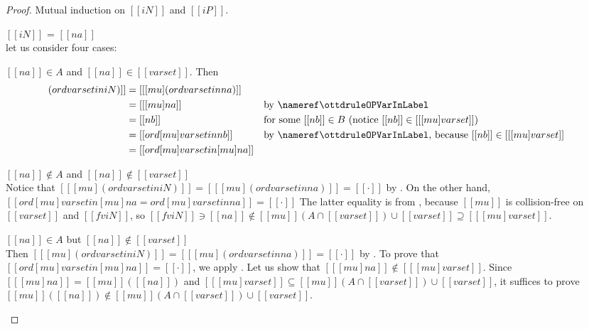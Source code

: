 \lemDistrMuOrd*
\begin{proof}
  Mutual induction on $[[iN]]$ and $[[iP]]$.
  \begin{caseof}
  \item $[[iN]]$ = $[[na]]$ \label{case:distr-mu-ord:var} \\
    let us consider four cases:
    \begin{caseof}
    \item $[[na]] \in A$ and $[[na]] \in [[varset]]$. Then
      \begin{align*} [[ [mu] (ord varset in iN) ]] &= [[ [mu] (ord varset in na)]] \\
                                                             &= [[ [mu] na ]]
                                                             && \text{by \ruleref{\ottdruleOPVarInLabel}}\\
                                                             &= [[nb]]
                                                             && \text{for some $[[nb]] \in B$ (notice $[[nb]] \in [[ [mu]varset ]]$)} \\
                                                             &= [[ ord [mu]varset in nb ]]
                                                             && \text{by \ruleref{\ottdruleOPVarInLabel},
                                                                because $[[nb]] \in [[ [mu]varset ]]$} \\
                                                             &= [[ord [mu] varset in [mu] na ]]
       \end{align*}
     \item $[[na]] \notin A$ and $[[na]] \notin [[varset]]$\\
       Notice that
       $[[ [mu] (ord varset in iN) ]] = [[ [mu] (ord varset in na)]] = [[·]]$ by
       .
       On the other hand, $[[ ord [mu] varset in [mu] na = ord [mu] varset
       in na ]] = [[·]]$ The latter equality is from
       , because
       $[[mu]]$ is collision-free on $[[varset]]$ and $[[fv iN]]$, so
       $[[fv iN]] \ni [[na]] \notin [[mu]](A \cap [[varset]]) \cup
       [[varset]] \supseteq [[ [mu] varset ]]$.
     \item $[[na]] \in A$ but $[[na]] \notin [[varset]]$\\ Then
       $[[ [mu] (ord varset in iN) ]] = [[ [mu] (ord varset in na)]] = [[·]]$
       by .
       To prove that\\ $[[ ord [mu] varset in [mu] na ]] = [[·]]$, we apply
       . Let us show that
       $[[ [mu] na ]] \notin [[ [mu] varset ]]$.
       Since $[[ [mu] na ]] = [[mu]]([[na]])$ and
       $[[ [mu] varset ]] \subseteq [[mu]](A \cap [[varset]]) \cup [[varset]]$,
       it suffices to prove 
       $[[mu]]([[na]]) \notin [[mu]](A \cap [[varset]]) \cup [[varset]]$.


\end{caseof}
\end{caseof}
\end{proof}
